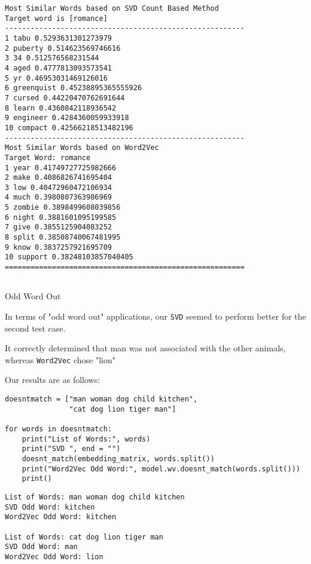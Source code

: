 \documentclass[12pt, letterpaper]{article}
\begin{document}
\begin{lstlisting}
Most Similar Words based on SVD Count Based Method
Target word is [romance]
--------------------------------------------------------
1 tabu 0.5293631301273979
2 puberty 0.514623569746616
3 34 0.512576568231544
4 aged 0.4777813093573541
5 yr 0.46953031469126016
6 greenquist 0.45238895365555926
7 cursed 0.44220470762691644
8 learn 0.4360842118936542
9 engineer 0.4284360059933918
10 compact 0.42566218513482196
--------------------------------------------------------
Most Similar Words based on Word2Vec
Target Word: romance
1 year 0.41749727725982666
2 make 0.4086826741695404
3 low 0.40472960472106934
4 much 0.3980807363986969
5 zombie 0.3898499608039856
6 night 0.3881601095199585
7 give 0.3855125904083252
8 split 0.38508740067481995
9 know 0.3837257921695709
10 support 0.38248103857040405
========================================================
    
\end{lstlisting}

{\large Odd Word Out}

In terms of "odd word out" applications, our \texttt{SVD} seemed to perform better for the second test case.

It correctly determined that man was not associated with the other animals, whereas \texttt{Word2Vec} chose "lion"

Our results are as follows:

\begin{mdframed}[backgroundcolor=shadecolor]
\begin{verbatim}
doesntmatch = ["man woman dog child kitchen", 
               "cat dog lion tiger man"]

for words in doesntmatch:
    print("List of Words:", words)
    print("SVD ", end = "")
    doesnt_match(embedding_matrix, words.split())
    print("Word2Vec Odd Word:", model.wv.doesnt_match(words.split()))
    print()

\end{verbatim}
\end{mdframed}

\begin{lstlisting}
List of Words: man woman dog child kitchen
SVD Odd Word: kitchen
Word2Vec Odd Word: kitchen

List of Words: cat dog lion tiger man
SVD Odd Word: man
Word2Vec Odd Word: lion    
\end{lstlisting}
\end{document}

